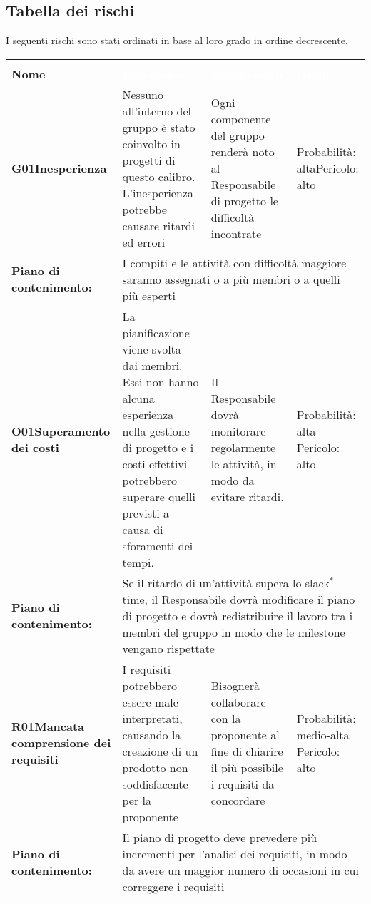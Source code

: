 \subsection{Tabella dei rischi}
I seguenti rischi sono stati ordinati in base al loro grado in ordine decrescente.\\
\begin{longtable}{>{\bfseries}p{2.5cm} p{4.5cm} p{4.5cm} p{2.5cm}}
	\rowcolor{LightBlue}
		\multirow{1}{2cm}{\textbf{\textcolor{white}{Codice\\ Nome}}}
		& \textbf{\textcolor{white}{Descrizione}}
		& \textbf{\textcolor{white}{Rilevamento}} 
		&  \textbf{\textcolor{white}{Grado}} \\[0.5cm]

		G01\newline Inesperienza
		&	Nessuno all'interno del gruppo è stato coinvolto in progetti di questo calibro. L'inesperienza potrebbe causare ritardi ed errori 
		& Ogni componente del gruppo renderà noto al Responsabile di progetto le difficoltà incontrate
		& Probabilità: alta\newline Pericolo: alto\\
		\rowcolor{LightGray}
		Piano di contenimento:
		&	\multicolumn{3}{p{12.5cm}}{I compiti e le attività con difficoltà maggiore saranno assegnati o a più membri o a quelli più esperti}\\[0.5cm]
		
		\hline
		O01\newline Superamento dei costi
		&	La pianificazione viene svolta dai membri. Essi non hanno alcuna esperienza nella gestione di progetto e i costi effettivi potrebbero superare quelli previsti a causa di sforamenti dei tempi. 
		& Il Responsabile dovrà monitorare regolarmente le attività, in modo da evitare ritardi.
		& Probabilità: alta \newline Pericolo: alto \\
		\rowcolor{LightGray}
		Piano di contenimento: 
		& \multicolumn{3}{p{12.5cm}}{Se il ritardo di un'attività supera lo slack$^*$ time, il Responsabile dovrà modificare il piano di progetto e dovrà redistribuire il lavoro tra i membri del gruppo in modo che le milestone vengano rispettate}\\[0.5cm]

		\hline
		R01\newline Mancata comprensione dei requisiti 
		& I requisiti potrebbero essere male interpretati, causando la creazione di un prodotto non soddisfacente per la proponente
		& Bisognerà collaborare con la proponente al fine di chiarire il più possibile i requisiti da concordare &
		  Probabilità: medio-alta \newline Pericolo: alto \\
		\rowcolor{LightGray}
		Piano di contenimento: 
		& \multicolumn{3}{p{12.5cm}}{Il piano di progetto deve prevedere più incrementi per l'analisi dei requisiti, in modo da avere un maggior numero di occasioni in cui correggere i requisiti}\\[0.5cm]


\end{longtable}
